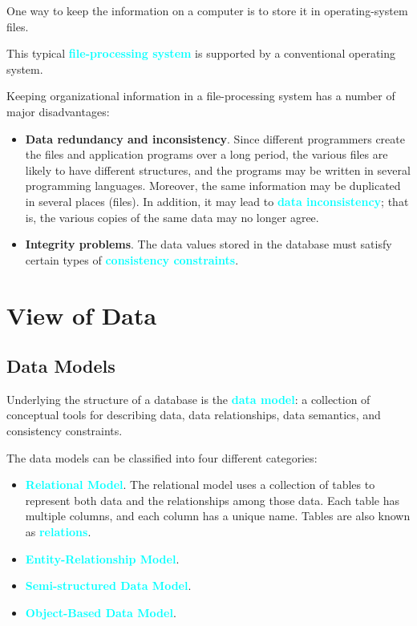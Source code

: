 \documentclass{Beautybook-EN}
\newcommand{\textcy}[1]{\textbf{\textcolor{cyan}{#1}}}
\begin{document}
One way to keep the information on a computer is to store it in operating-system files.

This typical \textcy{file-processing system} is supported by a conventional operating system.

Keeping organizational information in a file-processing system has a number of major disadvantages:
\begin{itemize}
    \item\textbf{Data redundancy and inconsistency}. Since different programmers create the files and application programs over a long period, the various files are likely to have different structures, and the programs may be written in several programming languages. Moreover, the same information may be duplicated in several places (files). In addition, it may lead to \textcy{data inconsistency}; that is, the various copies of the same data may no longer agree.
    \item\textbf{Integrity problems}. The data values stored in the database must satisfy certain types of \textcy{consistency constraints}.
\end{itemize}

\section{View of Data}
\subsection{Data Models}

Underlying the structure of a database is the \textcy{data model}: a collection of conceptual tools for describing data, data relationships, data semantics, and consistency constraints.

The data models can be classified into four different categories:
\begin{itemize}
    \item\textcy{Relational Model}. The relational model uses a collection of tables to represent both data and the relationships among those data. Each table has multiple columns, and each column has a unique name. Tables are also known as \textcy{relations}.
    \item\textcy{Entity-Relationship Model}.
    \item\textcy{Semi-structured Data Model}.
    \item\textcy{Object-Based Data Model}.
\end{itemize}
\end{document}
